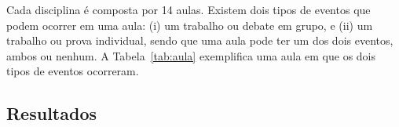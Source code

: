 Cada disciplina é composta por 14 aulas. Existem dois tipos de eventos que podem ocorrer em uma aula: (i) um trabalho ou debate em grupo, e (ii) um trabalho ou prova individual, sendo que uma aula pode ter um dos dois eventos, ambos ou nenhum. A Tabela~\ref{tab:aula} exemplifica uma aula em que os dois tipos de eventos ocorreram.


\subsection{Resultados}
\label{sec:resultados_cen1}

